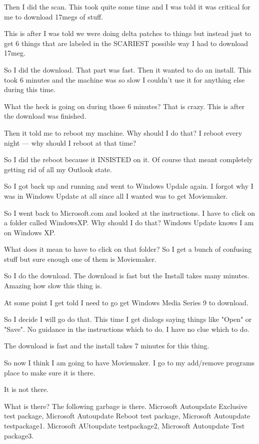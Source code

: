 \documentclass[letterpaper,10pt]{texMemo}
\begin{document}
Then I did the scan. This took quite some time and I was told it was critical for me to download 17megs of stuff.

This is after I was told we were doing delta patches to things but instead just to get 6 things that are labeled in the SCARIEST possible way I had to download 17meg.

So I did the download. That part was fast. Then it wanted to do an install. This took 6 minutes and the machine was so slow I couldn't use it for anything else during this time.

What the heck is going on during those 6 minutes? That is crazy. This is after the download was finished.

Then it told me to reboot my machine. Why should I do that? I reboot every night — why should I reboot at that time?

So I did the reboot because it INSISTED on it. Of course that meant completely getting rid of all my Outlook state.

So I got back up and running and went to Windows Updale again. I forgot why I was in Windows Update at all since all I wanted was to get Moviemaker.

So I went back to Microsoft.com and looked at the instructions. I have to click on a folder called WindowsXP. Why should I do that? Windows Update knows I am on Windows XP.

What does it mean to have to click on that folder? So I get a bunch of confusing stuff but sure enough one of them is Moviemaker.

So I do the download. The download is fast but the Install takes many minutes. Amazing how slow this thing is.

At some point I get told I need to go get Windows Media Series 9 to download.

So I decide I will go do that. This time I get dialogs saying things like "Open" or "Save". No guidance in the instructions which to do. I have no clue which to do.

The download is fast and the install takes 7 minutes for this thing.

So now I think I am going to have Moviemaker. I go to my add/remove programs place to make sure it is there.

It is not there.

What is there? The following garbage is there. Microsoft Autoupdate Exclusive test package, Microsoft Autoupdate Reboot test package, Microsoft Autoupdate testpackage1. Microsoft AUtoupdate testpackage2, Microsoft Autoupdate Test package3.
\end{document}
